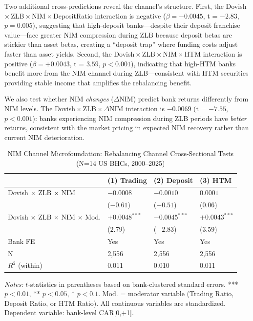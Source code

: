 \documentclass[12pt,a4paper]{article}
\begin{document}
Two additional cross-predictions reveal the channel's structure. First, the Dovish\,$\times$\,ZLB\,$\times$\,NIM\,$\times$\,DepositRatio interaction is negative ($\beta = -0.0045$, t = $-2.83$, $p = 0.005$), suggesting that high-deposit banks---despite their deposit franchise value---face greater NIM compression during ZLB because deposit betas are stickier than asset betas, creating a ``deposit trap'' where funding costs adjust faster than asset yields. Second, the Dovish\,$\times$\,ZLB\,$\times$\,NIM\,$\times$\,HTM interaction is positive ($\beta = +0.0043$, t = $3.59$, $p < 0.001$), indicating that high-HTM banks benefit more from the NIM channel during ZLB---consistent with HTM securities providing stable income that amplifies the rebalancing benefit.

We also test whether NIM \textit{changes} ($\Delta$NIM) predict bank returns differently from NIM levels. The Dovish\,$\times$\,ZLB\,$\times$\,$\Delta$NIM interaction is $-0.0069$ (t = $-7.55$, $p < 0.001$): banks experiencing NIM compression during ZLB periods have \textit{better} returns, consistent with the market pricing in expected NIM recovery rather than current NIM deterioration.

\begin{table}[H]
\centering
\caption{NIM Channel Microfoundation: Rebalancing Channel Cross-Sectional Tests (N=14 US BHCs, 2000--2025)}
\label{tab:nim_microfoundation}
\small
\begin{tabular}{llll}
\toprule
 & (1) Trading & (2) Deposit & (3) HTM \\
\midrule
Dovish $\times$ ZLB $\times$ NIM & $-0.0008$ & $-0.0010$ & $0.0001$ \\
 & ($-0.61$) & ($-0.51$) & ($0.06$) \\
Dovish $\times$ ZLB $\times$ NIM $\times$ Mod. & $+0.0048^{***}$ & $-0.0045^{***}$ & $+0.0043^{***}$ \\
 & ($2.79$) & ($-2.83$) & ($3.59$) \\
\midrule
Bank FE & Yes & Yes & Yes \\
N & 2,556 & 2,556 & 2,556 \\
$R^2$ (within) & 0.011 & 0.010 & 0.011 \\
\bottomrule
\end{tabular}
\end{table}
\noindent\textit{Notes:} $t$-statistics in parentheses based on bank-clustered standard errors. *** $p<0.01$, ** $p<0.05$, * $p<0.1$. Mod. = moderator variable (Trading Ratio, Deposit Ratio, or HTM Ratio). All continuous variables are standardized. Dependent variable: bank-level CAR[0,+1].
\end{document}
